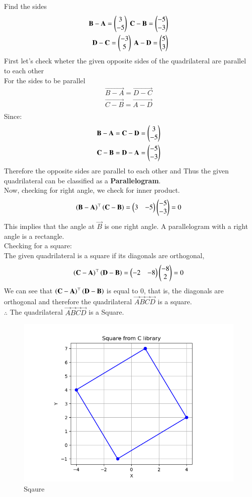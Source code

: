 \documentclass[journal]{IEEEtran}
\theoremstyle{remark}
\begin{document}
Find the sides
\begin{align}
\vec{B}-\vec{A}=\myvec{3\\-5} \  \vec{C}-\vec{B}=\myvec{-5\\-3} \\
\vec{D}-\vec{C}=\myvec{-3\\5} \ 
\vec{A}-\vec{D}=\myvec{5\\3}
\end{align}
First let's check wheter the given opposite sides of the quadrilateral are parallel to each other \\
For the sides to be parallel 
\begin{align}
    \vec{B-A}=\vec{D-C}\\
    \vec{C-B}=\vec{A-D}\\
\end{align}
Since:
\begin{align}
    \mathbf{B-A}=\mathbf{C-D}=\begin{pmatrix}3\\-5\end{pmatrix}\\
    \mathbf{C-B}=\mathbf{D-A}=\begin{pmatrix}-5\\-3\end{pmatrix}
\end{align}
Therefore the opposite sides are parallel to each other and Thus the given quadrilateral can be classified as a \textbf{Parallelogram}.\\
Now, checking for right angle, we check for inner product.
\begin{align}
 \left(\mathbf{B}- \mathbf{A}\right)^{\top} \left(\mathbf{C}- \mathbf{B}\right)=\begin{pmatrix}3 & -5\end{pmatrix}\begin{pmatrix}-5 \\ -3\end{pmatrix}=0
\end{align}
This implies that the angle at $\vec{B}$ is one right angle. A parallelogram with a right angle is a rectangle.\\
Checking for a square:\\
The given quadrilateral is a square if its diagonals are orthogonal,
\begin{align}
\left(\mathbf{C}- \mathbf{A}\right)^{\top} \left(\mathbf{D}- \mathbf{B}\right)=\begin{pmatrix}-2 & -8\end{pmatrix}\begin{pmatrix}-8 \\ 2\end{pmatrix}=0
\end{align}
We can see that $\left(\mathbf{C}- \mathbf{A}\right)^{\top} \left(\mathbf{D}- \mathbf{B}\right)$ is equal to $0$, that is, the diagonals are  orthogonal and therefore the quadrilateral $\vec{A}\vec{B}\vec{C}\vec{D}$ is a square.\\
$\therefore$ The quadrilateral $\vec{A}\vec{B}\vec{C}\vec{D}$ is a Square.

\begin{figure}[H]
    \centering
    \includegraphics[width=1\columnwidth]{figs/square.png}
    \caption{Sqaure}
    \label{fig:placeholder_1}
\end{figure}
\end{document}
